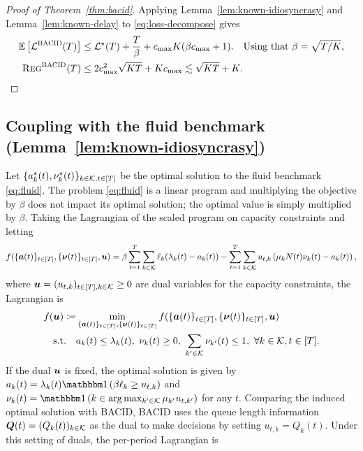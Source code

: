 \begin{proof}[Proof of Theorem~\ref{thm:bacid}]
Applying Lemma~\ref{lem:known-idiosyncrasy} and Lemma~\ref{lem:known-delay} to \eqref{eq:loss-decompose} gives
\begin{align*}
\mathbb E\left[\mathcal{L}^{\textsc{BACID}}(T)\right] &\leq  \mathcal{L}^\star(T) + \frac{T}{\beta}+c_{\max}K(\beta c_{\max}+1). \quad\text{Using that $\beta = \sqrt{T / K}$,}\\
\textsc{Reg}^{\textsc{BACID}}(T)&\leq 2c^2_{\max}\sqrt{KT} + Kc_{\max} \lesssim \sqrt{KT}+K.
\end{align*}
\end{proof}

\subsection{Coupling with the fluid benchmark (Lemma~\ref{lem:known-idiosyncrasy})}\label{ssec:bacid-idiosyncrasy}
Let $\{a^\star_k(t), \nu^\star_k(t)\}_{k \in \mathcal{K},t \in [T]}$ be the optimal solution to the fluid benchmark \eqref{eq:fluid}. The problem \eqref{eq:fluid} is a linear program and multiplying the objective by $\beta$ does not impact its optimal solution; the optimal value is simply multiplied by $\beta$. Taking the Lagrangian of the scaled program on capacity constraints and letting
\[f(\{\boldsymbol{a}(t)\}_{t \in [T]},\{\boldsymbol{\nu}(t)\}_{t \in [T]},\boldsymbol{u}) = \beta\sum_{t=1}^T \sum_{k \in \mathcal{K}} \ell_k(\lambda_k(t) - a_k(t))-\sum_{t=1}^T\sum_{k\in\mathcal{K}}u_{t,k}\left(\mu_kN(t)\nu_k(t) - a_k(t)\right),\]
where $\boldsymbol{u} = (u_{t,k})_{t \in [T], k \in \mathcal{K}} \geq 0$ are dual variables for the capacity constraints, the Lagrangian is
\begin{equation}
\begin{aligned}
f(\boldsymbol{u})\coloneqq&\min_{\{\boldsymbol{a}(t)\}_{t \in [T]},\{\boldsymbol{\nu}(t)\}_{t \in [T]}} f(\{\boldsymbol{a}(t)\}_{t \in [T]},\{\boldsymbol{\nu}(t)\}_{t \in [T]},\boldsymbol{u})  \\
\text{s.t.}\quad& a_k(t) \leq \lambda_k(t),~\nu_k(t) \geq 0,~\sum_{k' \in \mathcal{K}} \nu_{k'}(t) \leq 1,~\forall k \in \mathcal{K}, t\in [T].
\end{aligned}
\end{equation}
If the dual $\boldsymbol{u}$ is fixed, the optimal solution is given by $a_k(t) = \lambda_k(t) \indic{\beta \ell_k \geq u_{t,k}}$ and $\nu_k(t) = \indic{k \in \arg \max_{k' \in \set{K}} \mu_{k'} {u_{t,k'}}}$ for any $t$. Comparing the induced optimal solution with \textsc{BACID}, \textsc{BACID} uses the queue length information $\boldsymbol{Q}(t) = (Q_k(t))_{k \in \mathcal{K}}$ as the dual to make decisions by setting $u_{t,k} = Q_k(t)$. Under this setting of duals, the per-period Lagrangian is 
